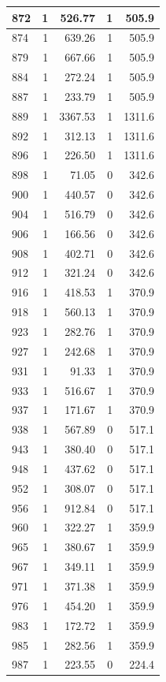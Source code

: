 \documentclass[
  12pt,
]{book}
\begin{document}
\begin{tabular}{l|r|r|r|r}
\hline
872 & 1 & 526.77 & 1 & 505.9\\
\hline
874 & 1 & 639.26 & 1 & 505.9\\
\hline
879 & 1 & 667.66 & 1 & 505.9\\
\hline
884 & 1 & 272.24 & 1 & 505.9\\
\hline
887 & 1 & 233.79 & 1 & 505.9\\
\hline
889 & 1 & 3367.53 & 1 & 1311.6\\
\hline
892 & 1 & 312.13 & 1 & 1311.6\\
\hline
896 & 1 & 226.50 & 1 & 1311.6\\
\hline
898 & 1 & 71.05 & 0 & 342.6\\
\hline
900 & 1 & 440.57 & 0 & 342.6\\
\hline
904 & 1 & 516.79 & 0 & 342.6\\
\hline
906 & 1 & 166.56 & 0 & 342.6\\
\hline
908 & 1 & 402.71 & 0 & 342.6\\
\hline
912 & 1 & 321.24 & 0 & 342.6\\
\hline
916 & 1 & 418.53 & 1 & 370.9\\
\hline
918 & 1 & 560.13 & 1 & 370.9\\
\hline
923 & 1 & 282.76 & 1 & 370.9\\
\hline
927 & 1 & 242.68 & 1 & 370.9\\
\hline
931 & 1 & 91.33 & 1 & 370.9\\
\hline
933 & 1 & 516.67 & 1 & 370.9\\
\hline
937 & 1 & 171.67 & 1 & 370.9\\
\hline
938 & 1 & 567.89 & 0 & 517.1\\
\hline
943 & 1 & 380.40 & 0 & 517.1\\
\hline
948 & 1 & 437.62 & 0 & 517.1\\
\hline
952 & 1 & 308.07 & 0 & 517.1\\
\hline
956 & 1 & 912.84 & 0 & 517.1\\
\hline
960 & 1 & 322.27 & 1 & 359.9\\
\hline
965 & 1 & 380.67 & 1 & 359.9\\
\hline
967 & 1 & 349.11 & 1 & 359.9\\
\hline
971 & 1 & 371.38 & 1 & 359.9\\
\hline
976 & 1 & 454.20 & 1 & 359.9\\
\hline
983 & 1 & 172.72 & 1 & 359.9\\
\hline
985 & 1 & 282.56 & 1 & 359.9\\
\hline
987 & 1 & 223.55 & 0 & 224.4\\

\end{tabular}
\end{document}

